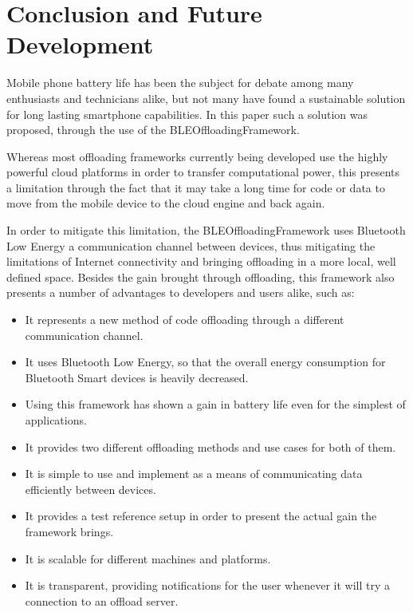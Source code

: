 \chapter{Conclusion and Future Development}
\label{chapter:conclusion}

Mobile phone battery life has been the subject for debate among many enthusiasts and technicians alike, but not many have found a sustainable solution for long lasting smartphone capabilities. In this paper such a solution was proposed, through the use of the BLEOffloadingFramework.

Whereas most offloading frameworks currently being developed use the highly powerful cloud platforms in order to transfer computational power, this presents a limitation through the fact that it may take a long time for code or data to move from the mobile device to the cloud engine and back again.

In order to mitigate this limitation, the BLEOffloadingFramework uses Bluetooth Low Energy a communication channel between devices, thus mitigating the limitations of Internet connectivity and bringing offloading in a more local, well defined space. Besides the gain brought through offloading, this framework also presents a number of advantages to developers and users alike, such as:


\begin{itemize}

\item{It represents a new method of code offloading through a different communication channel.}

\item{It uses Bluetooth Low Energy, so that the overall energy consumption for Bluetooth Smart devices is heavily decreased.}

\item{Using this framework has shown a gain in battery life even for the simplest of applications.}

\item{It provides two different offloading methods and use cases for both of them.}

\item{It is simple to use and implement as a means of communicating data efficiently between devices.}

\item{It provides a test reference setup in order to present the actual gain the framework brings.}

\item{It is scalable for different machines and platforms.}

\item{It is transparent, providing notifications for the user whenever it will try a connection to an offload server.}

\end{itemize}

